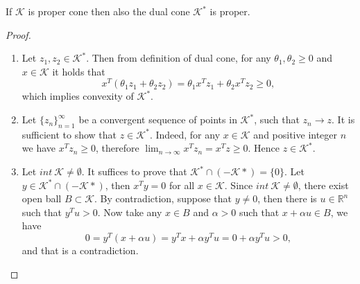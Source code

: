 \documentclass[12pt]{book}
\theoremstyle{definition}
\begin{document}
\begin{appendix}
\cor \label{DualOfAProperConeCorr}
If $\mathcal{K}$ is proper cone then also the dual cone $\mathcal{K}^*$ is proper.

\begin{proof}
\begin{enumerate}
\item Let $z_1,z_2 \in  \mathcal{K}^*$. Then from definition of dual cone, for any $\theta_1,\theta_2 \geq 0$ and $x \in \mathcal{K}$ it holds that
\begin{equation*}
x^T(\theta_1z_1 + \theta_2z_2) = \theta_1x^Tz_1 + \theta_2x^Tz_2 \geq 0,
\end{equation*}
which implies convexity of $\mathcal{K}^*$.%

\item Let $\{z_n\}_{n=1}^\infty$ be a convergent sequence of points in $\mathcal{K}^*$, such that 
$z_n\rightarrow z$. It is sufficient to show that $z\in \mathcal{K}^*.$  Indeed, for any $x\in \mathcal{K}$ and positive integer $n$ we have $x^Tz_n \geq 0$, therefore
$\lim_{n\rightarrow \infty} x^Tz_n = x^Tz \geq 0$. Hence $z\in \mathcal{K}^*.$

\item Let $int \ \mathcal{K}\neq \emptyset$. It suffices to prove that $\mathcal{K}^* \cap (-\mathcal{K}*) = \{0\}.$ Let $y\in \mathcal{K}^* \cap (-\mathcal{K}*)$, then 
$x^Ty = 0 $ for all $x\in \mathcal{K}$. Since $int \ \mathcal{K}\neq \emptyset$, there exist open ball $B\subset \mathcal{K}$. By contradiction, suppose that $y\neq 0$, then there is $u\in \mathbb{R}^n$ such that $y^Tu>0$. Now take any $x\in B$ and $\alpha>0$ such that $x+\alpha u\in B$, we have 
$$ 0 = y^T(x+\alpha u) = y^Tx + \alpha y^Tu = 0 + \alpha y^Tu > 0,$$
and that is a contradiction.



\end{enumerate}
\end{proof}
\end{appendix}
\end{document}
